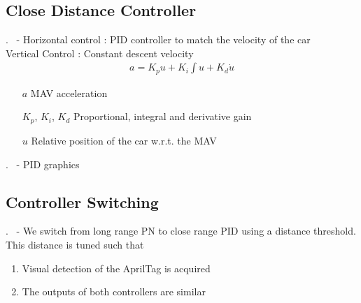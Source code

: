 \subsection{Close Distance Controller}
\begin{frame}{\thesection. \insertsection \ - \insertsubsection}
	Horizontal control : PID controller to match the velocity of the car\\
	Vertical Control : Constant descent velocity
	\begin{align}
		a = K_p u + K_i \int u + K_d \dot{u}
	\end{align}
	\begin{enumerate}
		\item[$a$] MAV acceleration
		\item[$K_p$, $K_i$, $K_d$] Proportional, integral and derivative gain
		\item[$u$] Relative position of the car w.r.t. the MAV 
	\end{enumerate}
\end{frame}


\begin{frame}{\thesection. \insertsection \ - \insertsubsection}
	PID graphics
\end{frame}


\subsection{Controller Switching}
\begin{frame}{\thesection. \insertsection \ - \insertsubsection}
	We switch from long range PN to close range PID using a distance threshold. This distance
	is tuned such that
	\begin{enumerate}
		\item Visual detection of the AprilTag is acquired
		\item The outputs of both controllers are similar
	\end{enumerate}
	
\end{frame}

